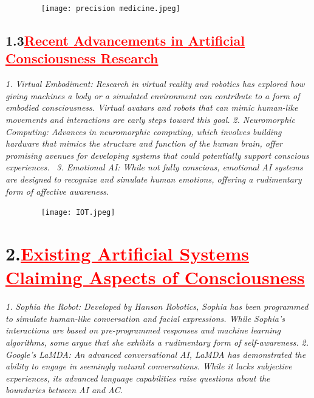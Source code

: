 \documentclass[12pt]{article}
\begin{document}
\begin{figure}
    \centering
    \texttt{[image: precision medicine.jpeg]}
\end{figure}
\newpage
\subsection*{\textbf{\hspace{1cm}1.3\hspace{1cm}\textcolor{red}{\underline{\large {Recent Advancements in Artificial Consciousness Research}}}}}
\hspace{1cm}\large{\emph{1. Virtual Embodiment: Research in virtual reality and robotics has explored how giving machines a body or a simulated environment can contribute to a form of embodied consciousness. Virtual avatars and robots that can mimic human-like movements and interactions are early steps toward this goal.}}\vspace{1cm}\newline
\hspace{1cm}\large{\emph{2. Neuromorphic Computing: Advances in neuromorphic computing, which involves building hardware that mimics the structure and function of the human brain, offer promising avenues for developing systems that could potentially support conscious experiences.}} \vspace{1cm}\newline
\hspace{1cm}\large{\emph{3. Emotional AI: While not fully conscious, emotional AI systems are designed to recognize and simulate human emotions, offering a rudimentary form of affective awareness.}} \vspace{1cm}\newline
\begin{figure}
    \centering
    \texttt{[image: IOT.jpeg]}
\end{figure}
\section*{\textbf{2.\hspace{1cm}\textcolor{red}{\underline{\large{Existing Artificial Systems Claiming Aspects of Consciousness}}}}}
\hspace{1cm}\large{\emph{1. Sophia the Robot: Developed by Hanson Robotics, Sophia has been programmed to simulate human-like conversation and facial expressions. While Sophia's interactions are based on pre-programmed responses and machine learning algorithms, some argue that she exhibits a rudimentary form of self-awareness.}}\vspace{1cm}\newline
\hspace{1cm}\large{\emph{2. Google's LaMDA: An advanced conversational AI, LaMDA has demonstrated the ability to engage in seemingly natural conversations. While it lacks subjective experiences, its advanced language capabilities raise questions about the boundaries between AI and AC.}}\vspace{1cm}\newline
\end{document}

